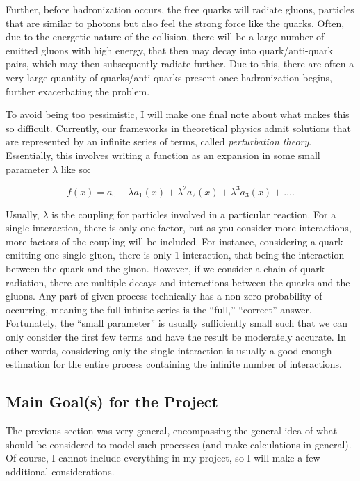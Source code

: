 Further, before hadronization occurs, the free quarks will radiate gluons, particles that are similar to photons but also feel the strong force like the quarks. Often, due to the energetic nature of the collision, there will be a large number of emitted gluons with high energy, that then may decay into quark/anti-quark pairs, which may then subsequently radiate further. Due to this, there are often a very large quantity of quarks/anti-quarks present once hadronization begins, further exacerbating the problem.

To avoid being too pessimistic, I will make one final note about what makes this so difficult. Currently, our frameworks in theoretical physics admit solutions that are represented by an infinite series of terms, called \textit{perturbation theory}. Essentially, this involves writing a function as an expansion in some small parameter $\lambda$ like so:

\begin{equation}
  f(x) = a_0 + \lambda a_1(x) + \lambda^2 a_2(x) + \lambda^3 a_3(x) + \ldots.
\end{equation}

Usually, $\lambda$ is the coupling for particles involved in a particular reaction. For a single interaction, there is only one factor, but as you consider more interactions, more factors of the coupling will be included. For instance, considering a quark emitting one single gluon, there is only 1 interaction, that being the interaction between the quark and the gluon. However, if we consider a chain of quark radiation, there are multiple decays and interactions between the quarks and the gluons. Any part of given process technically has a non-zero probability of occurring, meaning the full infinite series is the ``full,'' ``correct'' answer. Fortunately, the ``small parameter'' is usually sufficiently small such that we can only consider the first few terms and have the result be moderately accurate. In other words, considering only the single interaction is usually a good enough estimation for the entire process containing the infinite number of interactions.

\subsection{Main Goal(s) for the Project}

The previous section was very general, encompassing the general idea of what should be considered to model such processes (and make calculations in general). Of course, I cannot include everything in my project, so I will make a few additional considerations.

